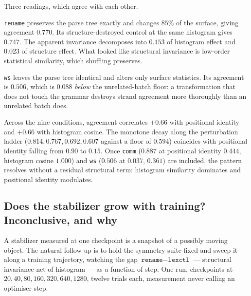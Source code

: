 Three readings, which agree with each other.

\begin{observation}
\label{obs:lexctl}
\texttt{rename} preserves the parse tree exactly and changes $85\%$ of the
surface, giving agreement $0.770$. Its structure-destroyed control at the same
histogram gives $0.747$. The apparent invariance decomposes into $0.153$ of
histogram effect and $0.023$ of structure effect. What looked like structural
invariance is low-order statistical similarity, which shuffling preserves.
\end{observation}

\begin{observation}
\label{obs:ws}
\texttt{ws} leaves the parse tree identical and alters only surface statistics.
Its agreement is $0.506$, which is $0.088$ \emph{below} the unrelated-batch
floor: a transformation that does not touch the grammar destroys strand
agreement more thoroughly than an unrelated batch does.
\end{observation}

\begin{observation}
\label{obs:ladder}
Across the nine conditions, agreement correlates $+0.66$ with positional
identity and $+0.66$ with histogram cosine. The monotone decay along the
perturbation ladder ($0.814,0.767,0.692,0.607$ against a floor of $0.594$)
coincides with positional identity falling from $0.90$ to $0.15$. Once
\texttt{comm} ($0.887$ at positional identity $0.444$, histogram cosine
$1.000$) and \texttt{ws} ($0.506$ at $0.037$, $0.361$) are included, the
pattern resolves without a residual structural term: histogram similarity
dominates and positional identity modulates.
\end{observation}

\subsection{Does the stabilizer grow with training? Inconclusive, and why}
\label{sec:stabilizer-evolution}

A stabilizer measured at one checkpoint is a snapshot of a possibly moving
object. The natural follow-up is to hold the symmetry suite fixed and sweep it
along a training trajectory, watching the gap
$\texttt{rename}-\texttt{lexctl}$ --- structural invariance net of histogram
--- as a function of step. One run, checkpoints at
$20,40,80,160,320,640,1280$, twelve trials each, measurement never calling an
optimiser step.

